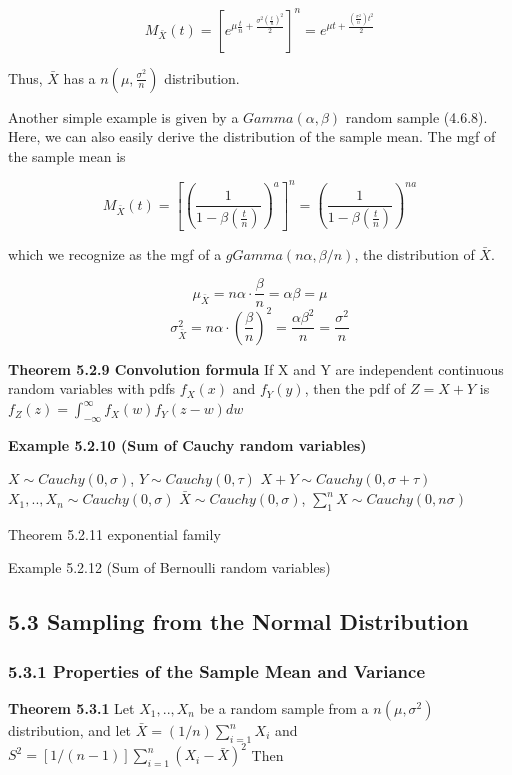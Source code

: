 \documentclass[6pt,twocolumn,Portrait]{article}
\begin{document}
\[M_{\bar X}(t)=\left[e^{\mu\frac{t}n+\frac{\sigma^2{(\frac{t}n)}^2}2}\right]^n=e^{\mu t+\frac{(\frac{\sigma^2}{n})t^2}2}\]

Thus, \(\bar X\) has a \(n(\mu,\frac{\sigma^2}n)\) distribution.

Another simple example is given by a \(Gamma(\alpha,\beta)\) random
sample (4.6.8). Here, we can also easily derive the distribution of the
sample mean. The mgf of the sample mean is

\[M_{\bar X}(t)=\left[\left(\frac1{1-\beta(\frac{t}n)}\right)^{a}\right]^n=\left(\frac1{1-\beta(\frac{t}n)}\right)^{na}\]

which we recognize as the mgf of a \(gGamma(n\alpha,\beta/n)\), the
distribution of \(\bar X\).

\[\mu_{\bar X}=n\alpha\cdot\frac\beta n=\alpha\beta=\mu\]
\[\sigma^2_{\bar X}=n\alpha\cdot(\frac\beta n)^2=\frac{\alpha\beta^2}n=\frac{\sigma^2}n\]

\textbf{Theorem 5.2.9 Convolution formula} If X and Y are independent
continuous random variables with pdfs \(f_X(x)\) and \(f_Y(y)\), then
the pdf of \(Z=X+Y\) is
\(f_Z(z) =\int_{-\infty}^{\infty}f_X(w)f_Y(z-w)dw\)

\textbf{Example 5.2.10 (Sum of Cauchy random variables)}

\(X\sim Cauchy(0,\sigma)\), \(Y\sim Cauchy(0,\tau)\)
\(X+Y\sim Cauchy(0,\sigma+\tau)\) \(X_1,..,X_n\sim Cauchy(0,\sigma)\)
\(\bar X\sim Cauchy(0,\sigma)\),
\(\sum_{1}^{n} X\sim Cauchy(0,n\sigma)\)

Theorem 5.2.11 exponential family

Example 5.2.12 (Sum of Bernoulli random variables)

\hypertarget{sampling-from-the-normal-distribution}{%
\subsection{5.3 Sampling from the Normal
Distribution}\label{sampling-from-the-normal-distribution}}

\hypertarget{properties-of-the-sample-mean-and-variance}{%
\subsubsection{5.3.1 Properties of the Sample Mean and
Variance}\label{properties-of-the-sample-mean-and-variance}}

\textbf{Theorem 5.3.1} Let \(X_1,..,X_n\) be a random sample from a
\(n (\mu,\sigma^2)\) distribution, and let
\(\bar X=(1/n)\sum_{i=1}^nX_i\) and
\(S^2=[1/(n-1)]\sum_{i=1}^n(X_i-\bar X)^2\) Then
\end{document}
